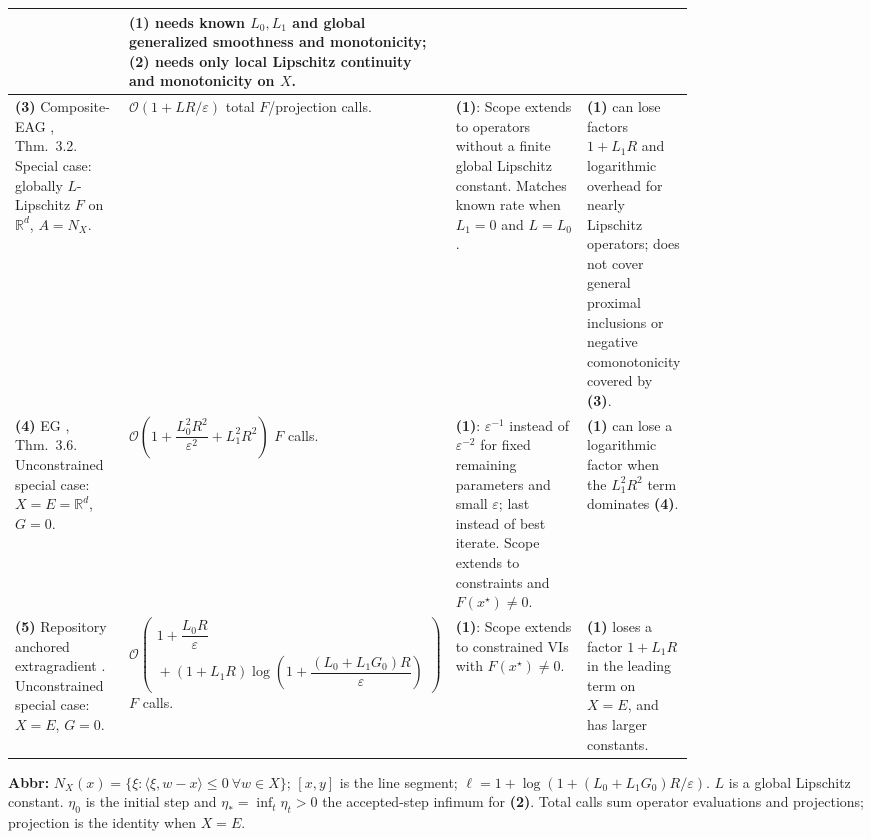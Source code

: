 \begin{table}[tp]
\begin{threeparttable}
\begin{tabularx}{\linewidth}{@{}>{\raggedright\arraybackslash}p{0.18\linewidth}>{\raggedright\arraybackslash}p{0.37\linewidth}>{\raggedright\arraybackslash}p{0.24\linewidth}>{\raggedright\arraybackslash}X@{}}
& \textbf{(1)} needs known $L_0,L_1$ and global generalized smoothness and monotonicity; \textbf{(2)} needs only local Lipschitz continuity and monotonicity on $X$. \\
\midrule
\textbf{(3)} Composite-EAG \citep{cgmCai2024v6}, Thm.~3.2. Special case: globally $L$-Lipschitz $F$ on $\mathbb{R}^d$, $A=N_X$.
& $\mathcal{O}(1+LR/\varepsilon)$ total $F$/projection calls.
& \textbf{(1)}: Scope extends to operators without a finite global Lipschitz constant. Matches known rate when $L_1=0$ and $L=L_0$.
& \textbf{(1)} can lose factors $1+L_1R$ and logarithmic overhead for nearly Lipschitz operators; does not cover general proximal inclusions or negative comonotonicity covered by \textbf{(3)}. \\
\midrule
\textbf{(4)} EG \citep{cgmChoudhury2025v1}, Thm.~3.6. Unconstrained special case: $X=E=\mathbb{R}^d$, $G=0$.
& $\mathcal{O}\!\left(1+\dfrac{L_0^2R^2}{\varepsilon^2}+L_1^2R^2\right)$ $F$ calls.
& \textbf{(1)}: $\varepsilon^{-1}$ instead of $\varepsilon^{-2}$ for fixed remaining parameters and small $\varepsilon$; last instead of best iterate. Scope extends to constraints and $F(x^\star)\ne0$.
& \textbf{(1)} can lose a logarithmic factor when the $L_1^2R^2$ term dominates \textbf{(4)}. \\
\midrule
\textbf{(5)} Repository anchored extragradient \citep{cgmRepositoryAnchored}. Unconstrained special case: $X=E$, $G=0$.
& $\mathcal{O}\!\left(\begin{gathered}1+\dfrac{L_0R}{\varepsilon}\\{}+(1+L_1R)\log\!\left(1+\dfrac{(L_0+L_1G_0)R}{\varepsilon}\right)\end{gathered}\right)$ $F$ calls.
& \textbf{(1)}: Scope extends to constrained VIs with $F(x^\star)\ne0$.
& \textbf{(1)} loses a factor $1+L_1R$ in the leading term on $X=E$, and has larger constants. \\
\bottomrule
\end{tabularx}
\begin{tablenotes}[flushleft]\footnotesize
\item[] \textbf{Abbr:} $N_X(x)=\{\xi:\langle\xi,w-x\rangle\le0\ \forall w\in X\}$; $[x,y]$ is the line segment; $\ell=1+\log(1+(L_0+L_1G_0)R/\varepsilon)$. $L$ is a global Lipschitz constant. $\eta_0$ is the initial step and $\eta_*=\inf_t\eta_t>0$ the accepted-step infimum for \textbf{(2)}. Total calls sum operator evaluations and projections; projection is the identity when $X=E$.
\end{tablenotes}
\end{threeparttable}
\end{table}
\clearpage
